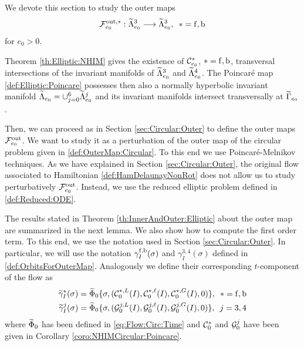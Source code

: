 We devote this section to  study the outer maps
\begin{equation}\label{def:OuterMap:Elliptic:0}
  \mathcal{F}_{e_0}^{\mathrm{out},\ast}:\widetilde\Lambda^3_{e_0}\longrightarrow \widetilde\Lambda^3_{e_0},\,\,\,\ast=\mathrm{f},\mathrm{b}
\end{equation}
for $e_0>0$.

Theorem \ref{th:Elliptic:NHIM} gives the existence of $\mathcal{C}^\ast_{e_0}$, $\ast=\mathrm{f},\mathrm{b} $, transversal intersections of  the invariant manifolds of $\widetilde\Lambda^3_{e_0}$ and $\widetilde\Lambda^4_{e_0}$. The Poincar{\'e} map \eqref{def:Elliptic:Poincare} possesses then also a normally hyperbolic invariant manifold $\widetilde\Lambda_{e_0}=\cup_{j=0}^6\widetilde\Lambda^j_{e_0}$ and its invariant manifolds intersect transversally at $\widetilde\Gamma_{e_0}$.

Then, we can proceed as in Section \ref{sec:Circular:Outer}
to define the outer maps $\mathcal{F}_{e_0}^{\mathrm{out}}$.  We want to study it
as a perturbation of the outer map of the circular problem given
in \eqref{def:OuterMap:Circular}. To this end we use
Poincar{\'e}-Melnikov techniques. As we have explained in
Section \ref{sec:Circular:Outer}, the original flow associated to
Hamiltonian \eqref{def:HamDelaunayNonRot} does not allow us to
study perturbatively $\mathcal{F}_{e_0}^{\mathrm{out}}$. Instead, we use the reduced elliptic problem defined in \eqref{def:Reduced:ODE}.

The results stated in Theorem \ref{th:InnerAndOuter:Elliptic} about the outer map are summarized in the next lemma. We also show how to compute the first order term. To this end, we use the notation used in Section \ref{sec:Circular:Outer}. In particular, we will use the
notation $\gamma_I^{\mathrm{f},\mathrm{b}}(\sigma)$ and $\gamma_I^{3,4}(\sigma)$ defined in \eqref{def:OrbitsForOuterMap}. Analogously we define their corresponding $t$-component of the flow as
\begin{equation}\label{def:OrbitsForOuterMap:t}
\begin{split}
\widetilde\gamma_I^\ast(\sigma) &=
\widetilde\Phi_0\{\sigma,(\mathcal{C}_0^{\ast,L}(I),\mathcal{C}_0^{\ast,\ell}(I),\mathcal{C}_0^{\ast,G}(I),0)\},\,\,\,\ast=\mathrm{f},\mathrm{b}\\
\widetilde\gamma_I^j(\sigma) &=
\widetilde\Phi_0\{\sigma,(\mathcal{G}_0^{j,L}(I),\mathcal{G}_0^{j,\ell}(I),\mathcal{G}_0^{j,G}(I),0)\},\,\,\, j=3,4\\
\end{split}
\end{equation}
where $\widetilde\Phi_0$ has been defined in \eqref{eq:Flow:Circ:Time} and $\mathcal{C}_0^\ast$ and $\mathcal{G}_0^j$ have been given in Corollary \ref{coro:NHIMCircular:Poincare}.

